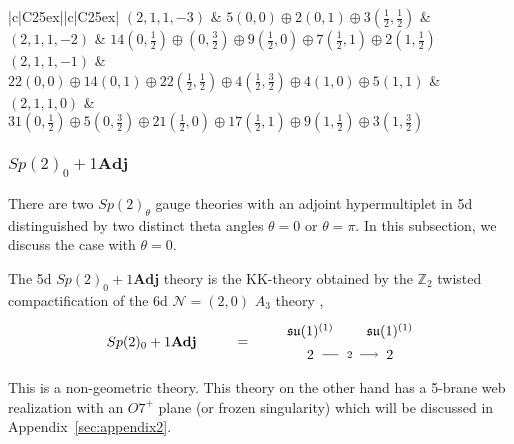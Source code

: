\begin{table}
\begin{tabular}{|c|C{25ex}||c|C{25ex}|}
		$ (2, 1, 1, -3) $ & $ 5(0,0) \oplus 2(0,1) \oplus 3(\frac{1}{2},\frac{1}{2}) $ & $ (2, 1, 1, -2) $ & $ 14(0,\frac{1}{2}) \oplus (0,\frac{3}{2}) \oplus 9(\frac{1}{2},0) \oplus 7(\frac{1}{2},1) \oplus 2(1,\frac{1}{2}) $ \\ \hline
		$ (2, 1, 1, -1) $ & $ 22(0,0) \oplus 14(0,1) \oplus 22(\frac{1}{2},\frac{1}{2}) \oplus 4(\frac{1}{2},\frac{3}{2}) \oplus 4(1,0) \oplus 5(1,1) $ & $ (2, 1, 1, 0) $ & $ 31(0,\frac{1}{2}) \oplus 5(0,\frac{3}{2}) \oplus 21(\frac{1}{2},0) \oplus 17(\frac{1}{2},1) \oplus 9(1,\frac{1}{2}) \oplus 3(1,\frac{3}{2}) $ \\ \hline
	\end{tabular}
	\caption{BPS spectrum of $ SU(3)_0 + 1\mathbf{Adj} $ theory for $ d_1 = 1 $, $ d_2, d_3 \leq 2 $ and $ d_1 = 2 $, $ d_2, d_3 \leq 1 $. Here $ \mathbf{d} = (d_1, d_2, d_3, d_4) $ labels the BPS states with charge $ d_1 m_0 + d_2 \alpha_1 + d_3 \alpha_2 + d_4 m_1 $, where $ \alpha_1 $ and $ \alpha_2 $ are simple roots of $ \mathfrak{su}(3) $ algebra. The states related by the symmetries $ d_2 \leftrightarrow d_3 $ and $ d_4 \leftrightarrow -d_4 $ are omitted.} \label{table:su3_adj}
\end{table}


\subsubsection{\texorpdfstring{$Sp(2)_0+1\mathbf{Adj}$}{Sp(2)0 + 1Adj}}

There are two $Sp(2)_\theta$ gauge theories with an adjoint hypermultiplet in 5d distinguished by two distinct theta angles $\theta=0$ or $\theta=\pi$. In this subsection, we discuss the case with $\theta= 0$.

The 5d $ Sp(2)_0 + 1\mathbf{Adj} $ theory is the KK-theory obtained by the $ \mathbb{Z}_2 $ twisted compactification of the 6d $ \mathcal{N} = (2, 0) $ $A_3$ theory \cite{Tachikawa:2011ch},
\begin{align}
\begin{tikzpicture}
\draw (0, 0) node {$ Sp(2)_0 + 1\mathbf{Adj} $}
(2.3, 0) node {$ = $}
(4, 0.3) node {$ \mathfrak{su}(1)^{(1)} $}
(4, -0.3) node {$ 2 $}
(6, 0.3) node {$ \mathfrak{su}(1)^{(1)} $}
(6, -0.3) node {$ 2 $}
(4.3, -0.3) -- (4.7, -0.3)
(5, -0.3) node {$ _2 $}
;
\draw [->] (5.25, -0.3) -- (5.7, -0.3);
\end{tikzpicture}
\end{align}
This is a non-geometric theory. This theory on the other hand has a 5-brane web realization with an $O7^+$ plane (or frozen singularity) which will be discussed in Appendix~\ref{sec:appendix2}. 

